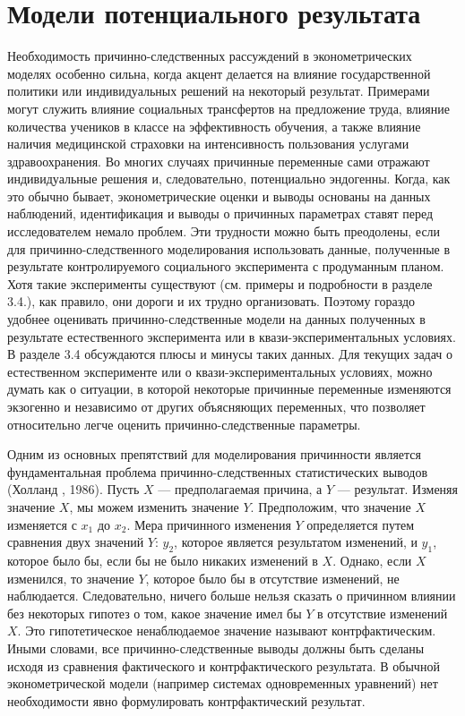 	
\section{Модели потенциального результата}


Необходимость причинно-следственных рассуждений в эконометрических моделях особенно сильна, когда акцент делается на влияние государственной политики или индивидуальных решений на некоторый результат. Примерами могут служить  влияние социальных трансфертов на предложение труда, влияние количества учеников в классе на эффективность обучения, а также влияние наличия медицинской страховки на интенсивность пользования услугами здравоохранения. 
Во многих случаях причинные переменные сами отражают индивидуальные решения и, следовательно, потенциально эндогенны. Когда, как это обычно бывает, эконометрические оценки и выводы основаны на данных наблюдений, идентификация и выводы о причинных параметрах ставят перед исследователем немало проблем. 
Эти трудности можно быть преодолены, если для причинно-следственного моделирования  использовать данные, полученные в результате контролируемого социального эксперимента с продуманным планом. 
Хотя такие эксперименты существуют (см. примеры и подробности в разделе 3.4.), как правило, они дороги и их трудно организовать.
Поэтому гораздо удобнее оценивать причинно-следственные модели на данных полученных в результате  естественного эксперимента или в квази-экспериментальных условиях. 
В разделе 3.4 обсуждаются плюсы и минусы таких  данных. Для текущих задач о естественном эксперименте или о квази-экспериментальных условиях, можно думать как о ситуации, в которой некоторые причинные переменные изменяются экзогенно и независимо от других объясняющих переменных, что позволяет относительно легче  оценить причинно-следственные параметры.
	
	
Одним из основных препятствий для моделирования причинности является фундаментальная проблема причинно-следственных статистических выводов (Холланд , 1986). Пусть $X$ --- предполагаемая причина, а $Y$ --- результат. Изменяя значение $X$, мы можем изменить значение $Y$. Предположим, что значение $X$ изменяется с $x_{1}$ до $x_{2}$. Мера причинного  изменения $Y$ определяется путем сравнения двух значений $Y$: $y_{2}$, которое является результатом изменений, и $y_{1}$, которое было бы, если бы не было никаких изменений в $X$. Однако, если $X$ изменился, то значение $Y$, которое было бы в отсутствие изменений, не наблюдается. Следовательно, ничего больше нельзя сказать о причинном влиянии без некоторых гипотез о том, какое значение имел бы $Y$ в отсутствие изменений $X$. Это гипотетическое ненаблюдаемое значение называют контрфактическим. Иными словами, все причинно-следственные  выводы должны быть сделаны исходя из сравнения фактического и контрфактического результата. В обычной эконометрической модели (например системах одновременных уравнений) нет необходимости явно формулировать контрфактический результат.
	
